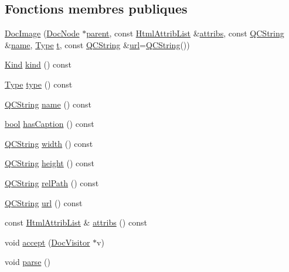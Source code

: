 \subsection*{Fonctions membres publiques}
\begin{DoxyCompactItemize}
\item 
\hyperlink{class_doc_image_a3fa7c3a472110e216ed7b7a9132aa868}{Doc\+Image} (\hyperlink{class_doc_node}{Doc\+Node} $\ast$\hyperlink{class_doc_node_a990d8b983962776a647e6231d38bd329}{parent}, const \hyperlink{class_html_attrib_list}{Html\+Attrib\+List} \&\hyperlink{class_doc_image_aceb10c2162bbfc08305aefa06e60dab3}{attribs}, const \hyperlink{class_q_c_string}{Q\+C\+String} \&\hyperlink{class_doc_image_afe5602e6c10611d79effbe40a7084e7b}{name}, \hyperlink{class_doc_image_aaa49d1dad195745ff9d470c5335be93e}{Type} \hyperlink{058__bracket__recursion_8tcl_a69e959f6901827e4d8271aeaa5fba0fc}{t}, const \hyperlink{class_q_c_string}{Q\+C\+String} \&\hyperlink{class_doc_image_a525c95734aff0357c93554a20cb7e442}{url}=\hyperlink{class_q_c_string}{Q\+C\+String}())
\item 
\hyperlink{class_doc_node_aebd16e89ca590d84cbd40543ea5faadb}{Kind} \hyperlink{class_doc_image_ae701a5efbe3afc7a80c919d55043a7af}{kind} () const 
\item 
\hyperlink{class_doc_image_aaa49d1dad195745ff9d470c5335be93e}{Type} \hyperlink{class_doc_image_ad53ee6da6eca8d462d5afad46b35492b}{type} () const 
\item 
\hyperlink{class_q_c_string}{Q\+C\+String} \hyperlink{class_doc_image_afe5602e6c10611d79effbe40a7084e7b}{name} () const 
\item 
\hyperlink{qglobal_8h_a1062901a7428fdd9c7f180f5e01ea056}{bool} \hyperlink{class_doc_image_a846afd9c5ca2750a20b375f9f2b635d2}{has\+Caption} () const 
\item 
\hyperlink{class_q_c_string}{Q\+C\+String} \hyperlink{class_doc_image_ae73c4cd5be7bdb5f1c9518678315530e}{width} () const 
\item 
\hyperlink{class_q_c_string}{Q\+C\+String} \hyperlink{class_doc_image_a3fda23ae9ca66c99b6e7fc5db9ea0d5d}{height} () const 
\item 
\hyperlink{class_q_c_string}{Q\+C\+String} \hyperlink{class_doc_image_a44a732e39a48bc129a372b2ec54c121c}{rel\+Path} () const 
\item 
\hyperlink{class_q_c_string}{Q\+C\+String} \hyperlink{class_doc_image_a525c95734aff0357c93554a20cb7e442}{url} () const 
\item 
const \hyperlink{class_html_attrib_list}{Html\+Attrib\+List} \& \hyperlink{class_doc_image_aceb10c2162bbfc08305aefa06e60dab3}{attribs} () const 
\item 
void \hyperlink{class_doc_image_a1b4b4bf3bd61ff33e96b612fe5c0d0d8}{accept} (\hyperlink{class_doc_visitor}{Doc\+Visitor} $\ast$v)
\item 
void \hyperlink{class_doc_image_acbcccdba0822fb5c0776ca318cbfd631}{parse} ()
\end{DoxyCompactItemize}

